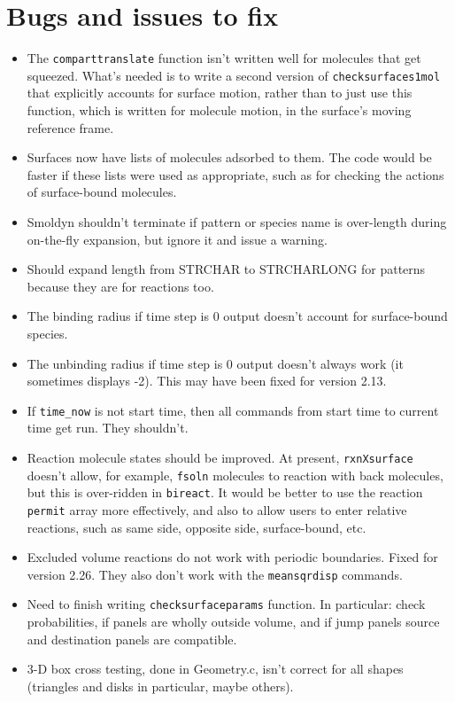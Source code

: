 \documentclass {scrbook}
\newcommand {\ttt} {\texttt}
\begin{document}
\section{Bugs and issues to fix}
\begin{itemize}
\item The \ttt{comparttranslate} function isn't written well for molecules that get squeezed. What's needed is to write a second version of \ttt{checksurfaces1mol} that explicitly accounts for surface motion, rather than to just use this function, which is written for molecule motion, in the surface's moving reference frame.
\item Surfaces now have lists of molecules adsorbed to them. The code would be faster if these lists were used as appropriate, such as for checking the actions of surface-bound molecules.
\item Smoldyn shouldn't terminate if pattern or species name is over-length during on-the-fly expansion, but ignore it and issue a warning.
\item Should expand length from STRCHAR to STRCHARLONG for patterns because they are for reactions too.
\item The binding radius if time step is 0 output doesn't account for surface-bound species.
\item The unbinding radius if time step is 0 output doesn't always work (it sometimes displays -2). This may have been fixed for version 2.13.
\item If \ttt{time\_now} is not start time, then all commands from start time to current time get run. They shouldn't.
\item Reaction molecule states should be improved. At present, \ttt{rxnXsurface} doesn't allow, for example, \ttt{fsoln} molecules to reaction with back molecules, but this is over-ridden in \ttt{bireact}. It would be better to use the reaction \ttt{permit} array more effectively, and also to allow users to enter relative reactions, such as same side, opposite side, surface-bound, etc.
\item Excluded volume reactions do not work with periodic boundaries. Fixed for version 2.26. They also don't work with the \ttt{meansqrdisp} commands.
\item Need to finish writing \ttt{checksurfaceparams} function. In particular: check probabilities, if panels are wholly outside volume, and if jump panels source and destination panels are compatible.
\item 3-D box cross testing, done in Geometry.c, isn't correct for all shapes (triangles and disks in particular, maybe others).

\end{itemize}
\end{document}
